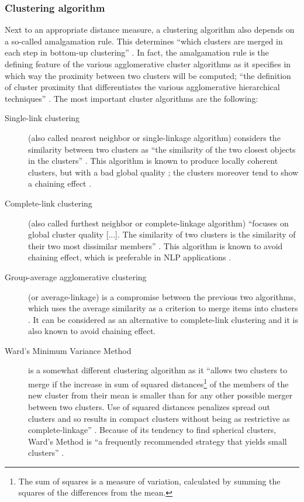 \subsubsection{Clustering algorithm}\label{sec:3.7.2.2}  
Next to an appropriate distance measure, a clustering algorithm also depends on a so-called amalgamation rule. This determines “which clusters are merged in each step in bottom-up clustering” \citep[503]{manning_foundations_1999}. In fact, the amalgamation rule is the defining feature of the various agglomerative cluster algorithms as it specifies in which way the proximity between two clusters will be computed; “the definition of cluster proximity that differentiates the various agglomerative hierarchical techniques” \citep[517]{tan_introduction_2006}. The most important cluster algorithms are the following:

\begin{description}
\item[Single-link clustering] (also called nearest neighbor or single-linkage algorithm) considers the similarity between two clusters as “the similarity of the two closest objects in the clusters” \citep[503]{manning_foundations_1999}. This algorithm is known to produce locally coherent clusters, but with a bad global quality \citep[503]{manning_foundations_1999}; the clusters moreover tend to show a chaining effect \citep[504]{manning_foundations_1999}.

\item[Complete-link clustering] (also called furthest neighbor or complete-linkage algorithm) “focuses on global cluster quality [...]. The similarity of two clusters is the similarity of their two most dissimilar members” \citep[505]{manning_foundations_1999}. This algorithm is known to avoid chaining effect, which is preferable in NLP applications \citep[506]{manning_foundations_1999}.

\item[Group-average agglomerative clustering] (or average-linkage) is a compromise between the previous two algorithms, which uses the average similarity as a criterion to merge items into clusters \citep[507]{manning_foundations_1999}. It can be considered as an alternative to complete-link clustering and it is also known to avoid chaining effect.

\item[Ward’s Minimum Variance Method] is a somewhat different clustering algorithm as it “allows two clusters to merge if the increase in sum of squared distances\footnote{The sum of squares is a measure of variation, calculated by summing the squares of the differences from the mean.} of the members of the new cluster from their mean is smaller than for any other possible merger between two clusters. Use of squared distances penalizes spread out clusters and so results in compact clusters without being as restrictive as complete-linkage” \citep[426]{glynn_cluster_2014}. Because of its tendency to find spherical clusters, Ward’s Method is “a frequently recommended strategy that yields small clusters” \citep[133]{divjak_structuring_2010}.
\end{description}

